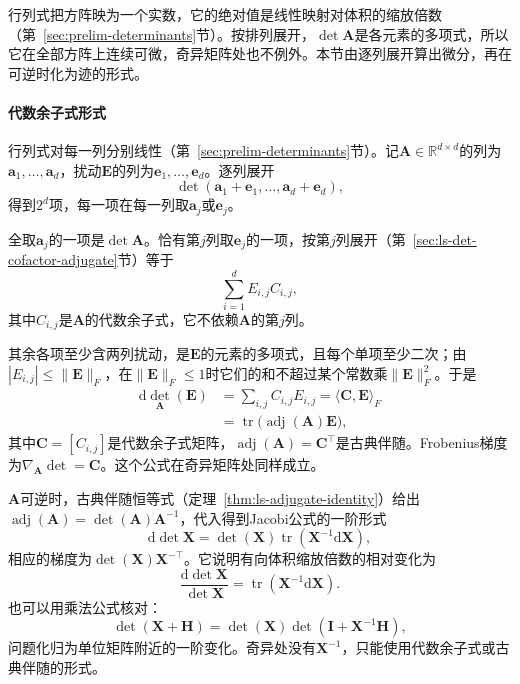 行列式把方阵映为一个实数，它的绝对值是线性映射对体积的缩放倍数（第~\ref{sec:prelim-determinants}节）。按排列展开，$\det\bm A$是各元素的多项式，所以它在全部方阵上连续可微，奇异矩阵处也不例外。本节由逐列展开算出微分，再在可逆时化为迹的形式。
\paragraph{代数余子式形式}
行列式对每一列分别线性（第~\ref{sec:prelim-determinants}节）。记$\bm A\in\mathbb R^{d\times d}$的列为$\bm a_1,\ldots,\bm a_d$，扰动$\bm E$的列为$\bm e_1,\ldots,\bm e_d$。逐列展开
\[
 \det(\bm a_1+\bm e_1,\ldots,\bm a_d+\bm e_d),
\]
得到$2^d$项，每一项在每一列取$\bm a_j$或$\bm e_j$。

全取$\bm a_j$的一项是$\det\bm A$。恰有第$j$列取$\bm e_j$的一项，按第$j$列展开（第~\ref{sec:ls-det-cofactor-adjugate}节）等于
\[
 \sum_{i=1}^dE_{i,j}C_{i,j},
\]
其中$C_{i,j}$是$\bm A$的代数余子式，它不依赖$\bm A$的第$j$列。

其余各项至少含两列扰动，是$\bm E$的元素的多项式，且每个单项至少二次；由$|E_{i,j}|\leq\lVert\bm E\rVert_F$，在$\lVert\bm E\rVert_F\leq1$时它们的和不超过某个常数乘$\lVert\bm E\rVert_F^2$。于是
\begin{equation}
 \begin{aligned}
 \mathrm d\det_{\bm A}(\bm E)
 &=\sum_{i,j}C_{i,j}E_{i,j}=\langle\bm C,\bm E\rangle_F\\
 &=\operatorname{tr}\bigl(\operatorname{adj}(\bm A)\bm E\bigr),
 \end{aligned}
\label{eq:multivariable-determinant-cofactor-differential}
\end{equation}
其中$\bm C=[C_{i,j}]$是代数余子式矩阵，$\operatorname{adj}(\bm A)=\bm C^\top$是古典伴随。Frobenius梯度为$\nabla_{\bm A}\det=\bm C$。这个公式在奇异矩阵处同样成立。

$\bm A$可逆时，古典伴随恒等式（定理~\ref{thm:ls-adjugate-identity}）给出$\operatorname{adj}(\bm A)=\det(\bm A)\bm A^{-1}$，代入得到Jacobi公式的一阶形式
\begin{equation}
 \mathrm{d}\det\bm{X}=\det(\bm{X})\operatorname{tr}(\bm{X}^{-1}\mathrm{d}\bm{X}),
\label{eq:multivariable-jacobi-formula}
\end{equation}
相应的梯度为$\det(\bm X)\bm X^{-\top}$。它说明有向体积缩放倍数的相对变化为
\[
 \frac{\mathrm d\det\bm X}{\det\bm X}=\operatorname{tr}(\bm X^{-1}\mathrm d\bm X).
\]
也可以用乘法公式核对：
\[
 \det(\bm X+\bm H)=\det(\bm X)\det(\bm I+\bm X^{-1}\bm H),
\]
问题化归为单位矩阵附近的一阶变化。奇异处没有$\bm X^{-1}$，只能使用代数余子式或古典伴随的形式。


